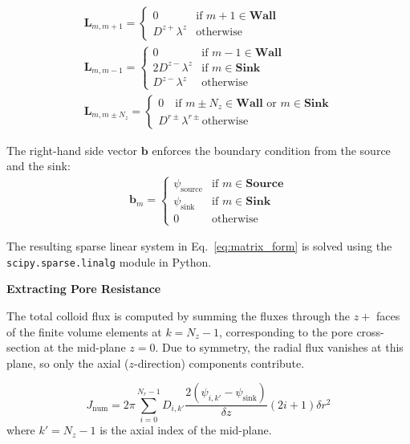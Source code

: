 \documentclass[10pt, a4paper]{article}
\begin{document}
\begin{multicols}{2}
\begin{eqnarray}
    \bm{L}_{m,m+1} =
    \begin{cases}
        0 &  \text{if } m+1 \in \textbf{Wall} \\
        D^{z+} \lambda^{z} &  \text{otherwise}
    \end{cases}
    \\
    \bm{L}_{m,m-1} =
    \begin{cases}
        0 &  \text{if } m-1 \in \textbf{Wall} \\
        2 D^{z-} \lambda^{z} & \text{if } m \in \textbf{Sink}\\
        D^{z-} \lambda^{z} &  \text{otherwise}
    \end{cases}
    \\
    \bm{L}_{m,m \pm N_z} =
    \begin{cases}
        0 \quad \text{if } m \pm N_z \in \textbf{Wall} \text{ or } m \in \textbf{Sink} \\
        D^{r\pm} \lambda^{r\pm}  \text{otherwise}
    \end{cases}
\end{eqnarray}


The right-hand side vector $\bm{b}$ enforces the boundary condition from the source and the sink:
\begin{eqnarray}
    \bm{b}_m = 
    \begin{cases}
        \psi_{\text{source}} & \text{if } m \in \textbf{Source} \\
        \psi_{\text{sink}} & \text{if } m \in \textbf{Sink} \\
        0 & \text{otherwise}
    \end{cases}
\end{eqnarray}

The resulting sparse linear system in Eq.~\eqref{eq:matrix_form} is solved using the \texttt{scipy.sparse.linalg} module in Python.

\textbf{Extracting Pore Resistance}

The total colloid flux is computed by summing the fluxes through the $z+$ faces of the finite volume elements at $k = N_z - 1$, corresponding to the pore cross-section at the mid-plane $z = 0$.
Due to symmetry, the radial flux vanishes at this plane, so only the axial ($z$-direction) components contribute.

\begin{equation}
    J_{\text{num}} = 2\pi \sum_{i=0}^{N_r-1} D_{i,k'} \frac{2(\psi_{i,k'} - \psi_{\text{sink}})}{\delta z} (2i + 1) \delta r^2
\end{equation}
where $k' = N_z - 1$ is the axial index of the mid-plane.


\end{multicols}
\end{document}
